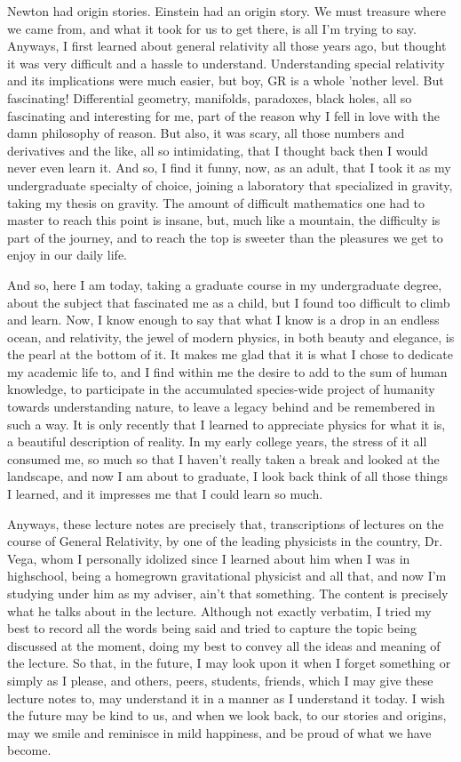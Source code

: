 	Newton had origin stories. Einstein had an origin story. We must treasure where we came from, and 
	what it took for us to get there, is all I'm trying to say. Anyways, I first learned about general 
	relativity all those years ago, but thought it was very difficult and a hassle to understand. Understanding
	special relativity and its implications were much easier, but boy, GR is a whole 'nother level. 
	But fascinating! Differential geometry, manifolds, paradoxes, black holes, all so fascinating and interesting
	for me, part of the reason why I fell in love with the damn philosophy of reason. But also, it was scary,
	all those numbers and derivatives and the like, all so intimidating, that I thought back then I 
	would never even learn it. And so, I 
	find it funny, now, as an adult, that I took it as my undergraduate specialty of choice, joining
	a laboratory that specialized in gravity, taking my thesis on gravity. The amount of difficult mathematics
	one had to master to reach this point is insane, but, much like a mountain, the difficulty is part
	of the journey, and to reach the top is sweeter than the pleasures we get to enjoy in our daily life.

	And so, here I am today, taking a graduate course in my undergraduate degree, about the subject that
	fascinated me as a child, but I found too difficult to climb and learn. Now, I know enough to say
	that what I know is a drop in an endless ocean, and relativity, the jewel of modern physics, in 
	both beauty and elegance, is the pearl at the bottom of it.
	It makes me glad that it is what I chose to dedicate my academic life to, and I find within me
	the desire to add to the sum of human knowledge, to participate in the accumulated species-wide project
	of humanity towards understanding nature, to leave a legacy behind and be remembered
	in such a way. It is only recently that I learned
	to appreciate physics for what it is, a beautiful description of reality. In my early college years, the
	stress of it all consumed me, so much so that I haven't really taken a break and looked at the landscape,
	and now I am about to graduate, I look back think of all those things 
	I learned, and it impresses me that I could learn so much.

	Anyways, these lecture notes are precisely that, transcriptions of lectures on the course of General Relativity,
	by one of the leading physicists in the country, Dr. Vega, whom I personally idolized since I
	learned about him when I was in highschool, being a homegrown gravitational physicist and all that,
	and now I'm studying under him as my adviser, ain't that something.
	The content is precisely what he talks about in the lecture. Although not exactly verbatim, I tried 
	my best to record all the words being said and tried to capture the topic being discussed at the moment,
	doing my best to convey all the ideas and meaning of the lecture. So that, in the future, I may look upon it when I forget something or simply
	as I please, and others, peers, students, friends, which I may give these lecture
	notes to, may understand it in a manner as I understand it today. I wish the future may be kind to us,
	and when we look back, to our stories and origins, may we smile and reminisce in mild happiness,
	and be proud of what we have become.

